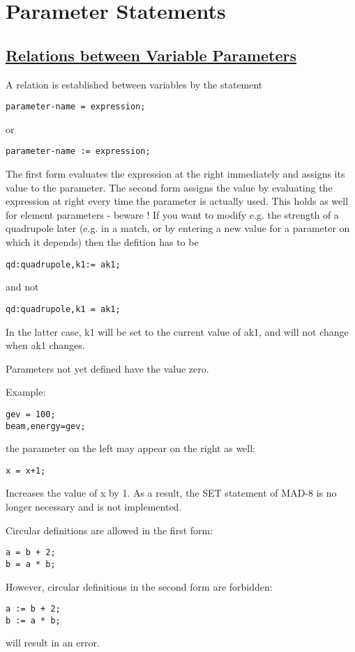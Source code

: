 

\chapter{Parameter Statements}
\label{chap:parameter}

\section{\href{relation}{Relations between Variable Parameters}}
 A relation is established between variables by the statement 
\begin{verbatim}
parameter-name = expression;
\end{verbatim} 
or 
\begin{verbatim}
parameter-name := expression;
\end{verbatim} 
The first form evaluates the expression at the right immediately and
assigns its value to the parameter. The second form assigns the value by
evaluating  the expression at right every time the parameter is actually
used. This holds as well for element parameters - beware ! If you want
to modify e.g. the strength of a quadrupole later (e.g. in a match,  or
by entering a new value for a parameter on which it depends) then the
defition has to be  
\begin{verbatim}
qd:quadrupole,k1:= ak1;
\end{verbatim} 
and not 
\begin{verbatim}
qd:quadrupole,k1 = ak1;
\end{verbatim} 
In the latter case, k1 will be set to the current value of ak1, and will
not change when ak1 changes.  

Parameters not yet defined have the value zero. 

Example: 
\begin{verbatim}
gev = 100;
beam,energy=gev;
\end{verbatim} 
the parameter on the left may appear on the right as well: 
\begin{verbatim}
x = x+1;
\end{verbatim} 
Increases the value of x by 1. As a result, the SET statement of MAD-8
is no longer necessary and is not implemented.  


Circular definitions are allowed in the first form:
\begin{verbatim}
a = b + 2;
b = a * b;
\end{verbatim}
However, circular definitions in the second form are forbidden:
\begin{verbatim}
a := b + 2;
b := a * b;
\end{verbatim}
will result in an error.


